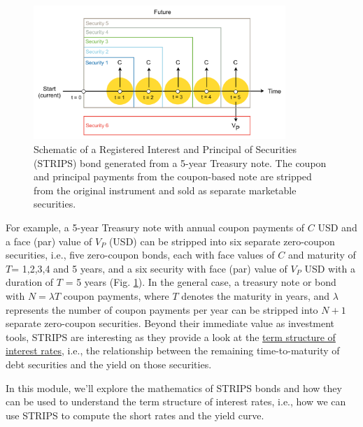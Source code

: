 \documentclass[11pt]{article}
\theoremstyle{definition}
\begin{document}
\begin{figure}[h]
    \centering
    \includegraphics[width=0.85\textwidth]{./figs/Fig-STRIPS-Schematic.pdf}
    \caption{Schematic of a Registered Interest and Principal of Securities (STRIPS) bond generated from a 5-year Treasury note. The coupon and principal payments from the coupon-based 
	note are stripped from the original instrument and sold as separate marketable securities.}\label{fig:strips-bond-schematic}
\end{figure}

For example, a 5-year Treasury note with annual coupon payments of $C$ USD and a face (par) value of $V_{P}$ (USD)
can be stripped into six separate zero-coupon securities, i.e., five zero-coupon bonds, each with face values of $C$ 
and maturity of $T$= 1,2,3,4 and 5 years, and a six security with face  (par) value of $V_{P}$ USD with a duration of $T$ = 5 years (Fig. \ref{fig:strips-bond-schematic}). 
In the general case, a treasury note or bond with $N=\lambda{T}$ coupon payments, where $T$ denotes the maturity in years, and $\lambda$ represents 
the number of coupon payments per year can be stripped into $N+1$ separate zero-coupon securities.
Beyond their immediate value as investment tools, STRIPS are interesting as they provide a look at the 
\href{https://www.federalreserve.gov/data/yield-curve-models.htm}{term structure of interest rates}, i.e., the relationship between the remaining time-to-maturity of debt securities 
and the yield on those securities.

In this module, we'll explore the mathematics of STRIPS bonds and how they can be used to understand the term structure of interest rates, i.e., how we can use STRIPS to compute the short rates and the yield curve.
\end{document}
